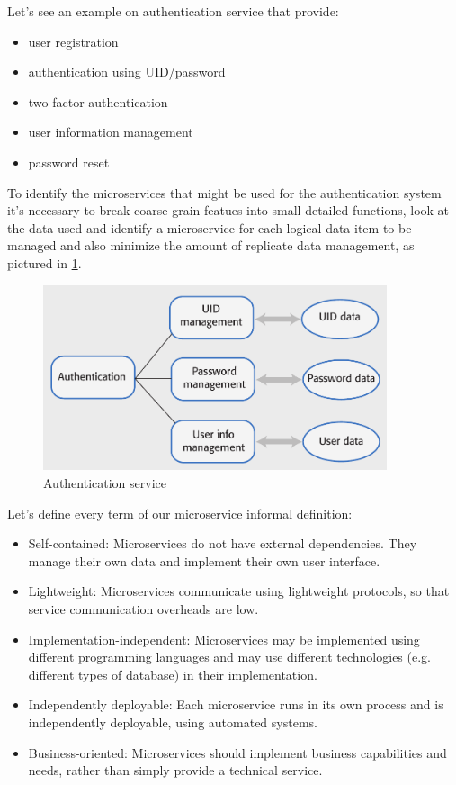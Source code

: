 \documentclass[10pt,a4paper]{report}
\begin{document}
Let's see an example on authentication service that provide:
\begin{itemize}
	\item user registration
	\item authentication using UID/password
	\item two-factor authentication
	\item user information management
	\item password reset
\end{itemize}
To identify the microservices that might be used for the authentication system it's necessary to break coarse-grain featues into small detailed functions, look at the data used and identify a microservice for each logical data item to be managed and also minimize the amount of replicate data management, as pictured in \ref{image60}.
\begin{figure}[h]
	\centering
	\includegraphics[width=0.9\textwidth]{image60}
	\caption{Authentication service}
	\label{image60}
\end{figure} 

Let's define every term of our microservice informal definition:
\begin{itemize}
	\item Self-contained: Microservices do not have external dependencies. They manage their own data and implement their own user interface.
	\item Lightweight: Microservices communicate using lightweight protocols, so that service
	communication overheads are low.
	\item Implementation-independent: Microservices may be implemented using different programming languages and may
	use different technologies (e.g. different types of database) in their implementation.
	\item Independently deployable: Each microservice runs in its own process and is independently deployable, using
	automated systems.
	\item Business-oriented: Microservices should implement business capabilities and needs, rather than simply
	provide a technical service.
	
\end{itemize}
\end{document}
